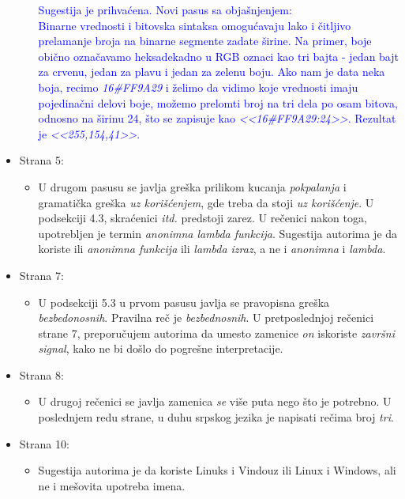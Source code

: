 \documentclass[a4paper]{report}
\newcommand{\odgovor}[1]{\textcolor{blue}{#1}}
\begin{document}
\begin{itemize}
\begin{itemize}
\odgovor{Sugestija je prihvaćena. Novi pasus sa objašnjenjem: \\
Binarne vrednosti i bitovska sintaksa omogućavaju lako i čitljivo prelamanje broja na binarne segmente zadate širine. 
Na primer, boje obično označavamo heksadekadno u RGB oznaci kao tri bajta - jedan bajt za crvenu, jedan za plavu i jedan za zelenu boju.
Ako nam je data neka boja, recimo \textit{16\#FF9A29} i
želimo da vidimo koje vrednosti imaju pojedinačni delovi boje, možemo
prelomti broj na tri dela po osam bitova, odnosno na širinu 24, što se 
zapisuje kao \textit{<<16\#FF9A29:24>>}. Rezultat je \textit{<<255,154,41>>}.}        
        
    \end{itemize}
    \item Strana 5:
    \begin{itemize}
        \item U drugom pasusu se javlja greška prilikom kucanja \textit{pokpalanja} i gramatička greška \textit{uz korišćenjem}, gde treba da stoji \textit{uz korišćenje}. U podsekciji 4.3, skraćenici \textit{itd.} predstoji zarez. U rečenici nakon toga, upotrebljen je termin \textit{anonimna lambda funkcija}. Sugestija autorima je da koriste ili \textit{anonimna funkcija} ili \textit{lambda izraz}, a ne i \textit{anonimna} i \textit{lambda}. 
    \end{itemize}
    \item Strana 7:
    \begin{itemize}
        \item U podsekciji 5.3 u prvom pasusu javlja se pravopisna greška \textit{bezbedonosnih}. Pravilna reč je \textit{bezbednosnih}. U pretposlednjoj rečenici strane 7, preporučujem autorima da umesto zamenice \textit{on} iskoriste \textit{završni signal}, kako ne bi došlo do pogrešne interpretacije.
    \end{itemize}
    \item Strana 8:
    \begin{itemize}
        \item U drugoj rečenici se javlja zamenica \textit{se} više puta nego što je potrebno. U poslednjem redu strane, u duhu srpskog jezika je napisati rečima broj \textit{tri}.
    \end{itemize}
    \item Strana 10:
    \begin{itemize}
        \item Sugestija autorima je da koriste Linuks i Vindouz ili Linux i Windows, ali ne i mešovita upotreba imena.

\end{itemize}
\end{itemize}
\end{document}

